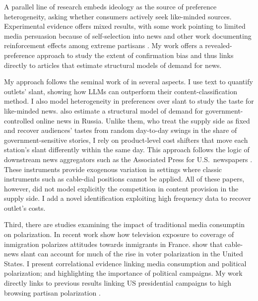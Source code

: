 \documentclass[12pt]{article}
\begin{document}
A parallel line of research embeds ideology as the source of preference heterogeneity, asking whether consumers actively seek like-minded sources. Experimental evidence offers mixed results, with some work pointing to limited media persuasion because of self-selection into news \citep{arceneaux_johnson_2013} and other work documenting reinforcement effects among extreme partisans \citep{levendusky}. My work offers a revealed-preference approach to study the extent of confirmation bias and thus links directly to articles that estimate structural models of demand for news.


My approach follows the seminal work of \citet{gentzkow2010media} in several aspects. I use text to quantify outlets’ slant, showing how LLMs can outperform their content-classification method. I also model heterogeneity in preferences over slant to study the taste for like-minded news. \citet{SimonovRao2022} also estimate a structural model of demand for government-controlled online news in Russia. Unlike them, who treat the supply side as fixed and recover audiences’ tastes from random day-to-day swings in the share of government-sensitive stories, I rely on product-level cost shifters that move each station’s slant differently within the same day. This approach follows the logic of downstream news aggregators such as the Associated Press for U.S.\ newspapers \citep{milena}. These instruments provide exogenous variation in settings where classic instruments such as cable-dial positions \citep{martin2017} cannot be applied. All of these papers, however, did not model explicitly the competition in content provision in the supply side. I add a novel identification exploiting high frequency data to recover outlet's costs.


Third, there are studies examining the impact of traditional media consumptin on polarization. In recent work \cite{schneider2025media} show how television exposure to coverage of inmigration polarizes attitudes towards inmigrants in France. 
\citet{martin2017} show that cable-news slant can account for much of the rise in voter polarization in the United States.  I present correlational evidence linking media consumption and political polarization; and highlighting the importance of political campaigns. My work directly links to previous results linking US presidential campaigns to high browsing partisan polarization \citep{Peterson2017Echo}.
\end{document}
